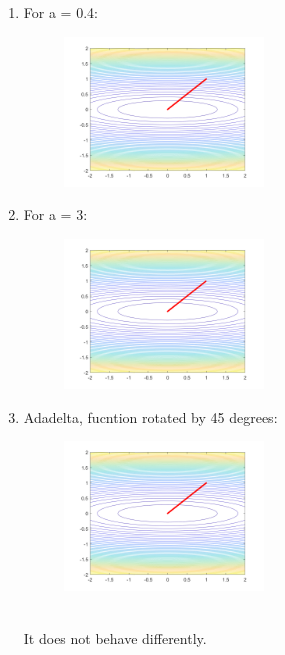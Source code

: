 \documentclass{article}
\begin{document}
\begin{enumerate}
    \item For a = 0.4:
          \begin{figure}[h]
            \centering
            \includegraphics[width=0.5\textwidth]{problem80.4.png}      
          \end{figure}
    \item For a = 3:
          \begin{figure}[h]
            \centering
            \includegraphics[width=0.5\textwidth]{problem83.png}            
          \end{figure} 
          \newpage
    \item Adadelta, fucntion rotated by 45 degrees:
          \begin{figure}[h]
            \centering
            \includegraphics[width=0.5\textwidth]{problem8rotated.png}            
          \end{figure} 
          \noindent \\It does not behave differently. 
            
\end{enumerate}
\end{document}
